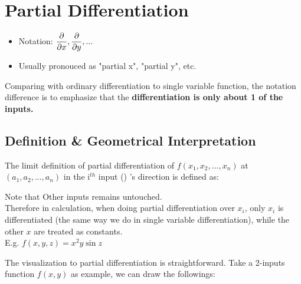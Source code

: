 \documentclass[class=article, crop=false, 12pt]{standalone}
\begin{document}
\linesep
\section{Partial Differentiation}

\begin{itemize}
    \item Notation: $\pdvv{x}, \pdvv{y}, ...$
    \item Usually pronouced as "partial x", "partial y", etc.
\end{itemize}

Comparing with ordinary differentiation to single variable function, 
the notation difference is to emphasize that the \bf{differentiation is only about 1 of the inputs}. 

\subsection{Definition \& Geometrical Interpretation}

The limit definition of partial differentiation of $f(x_1, x_2,..., x_n)$ at $(a_1, a_2,...,a_n)$ in the i$^{th}$ input () 's direction is defined as:

Note that  Other inputs remains untouched.\\

Therefore in calculation, when doing partial differentiation over $x_i$,
only $x_i$ is differentiated (the same way we do in single variable differentiation), while the other $x$ are treated as constants.\\

E.g. $f(x,y,z) = x^2y\sin{z}$

The visualization to partial differentiation is straightforward. 
Take a 2-inputs function $f(x,y)$ as example, we can draw the followings:
\end{document}
